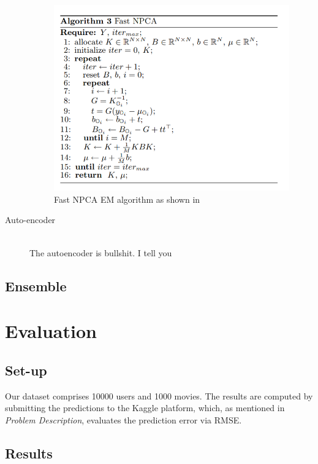 \documentclass[10pt,conference,compsocconf]{IEEEtran}
\begin{document}
\begin{description}
\begin{figure}[h!]
\centering
\includegraphics[scale=0.6]{emnpca.png}
\caption{Fast NPCA EM algorithm as shown in \cite{npca}}
\label{emnpca}
\end{figure} 

\item[Auto-encoder] \ \\
The autoencoder is bullshit. I tell you 

\end{description}

\subsection{Ensemble}

\section{Evaluation}
\label{res}

\subsection{Set-up}

Our dataset comprises 10000 users and 1000 movies. The results are computed by submitting the predictions to the Kaggle platform, which, as mentioned in \emph{Problem Description}, evaluates the prediction error via RMSE.

\subsection{Results}
\end{document}
